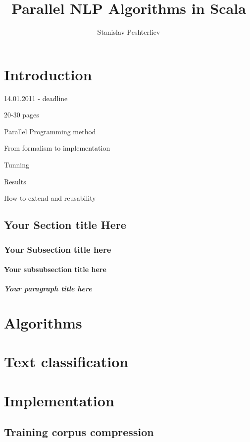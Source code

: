 \documentclass{report}
\author{Stanislav Peshterliev}
\title{Parallel NLP Algorithms in Scala}
\begin{document}
\maketitle

\tableofcontents

\chapter{Introduction}

14.01.2011 - deadline 

20-30 pages

Parallel Programming method

From formalism to implementation

Tunning

Results

How to extend and reusability

\cite{berger_a1-etal:1996a}
\cite{conf/nips/MannMMSW09}

\section{Your Section title Here}
\subsection{Your Subsection title here}
\subsubsection{Your subsubsection title here}
\paragraph{Your paragraph title here}

\chapter{Algorithms}

\chapter{Text classification}

\chapter{Implementation}

\section{Training corpus compression}
\end{document}
